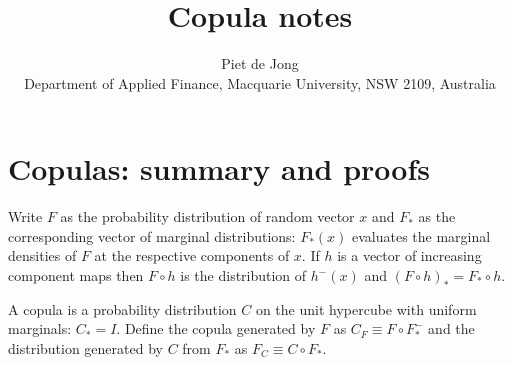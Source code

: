 \documentclass[useAMS,usenatbib,referee]{article}
\title{Copula notes}
\author
{ Piet de Jong\emailx{piet.dejong@mq.edu.au} \\
Department of Applied Finance, Macquarie University, NSW 2109, Australia}
\begin{document}
\section*{Copulas: summary and proofs}

Write $F$ as the probability distribution of random vector $x$ and $F_*$ as the corresponding vector of marginal distributions: $F_*(x)$  evaluates the marginal densities of $F$ at the respective components of $x$.  If $h$ is a vector of increasing component maps then $F\circ h$ is the distribution of $h^-(x)$  and  $(F\circ h)_*=F_*\circ h$.

A copula is a probability distribution $C$ on the unit hypercube with uniform marginals: $C_*=I$.  
Define the copula generated by $F$ as $
C_F\equiv F\circ F_*^-$ and the distribution generated by $C$ from $F_*$ as 
$
F_C\equiv C\circ F_*$.  
\end{document}
